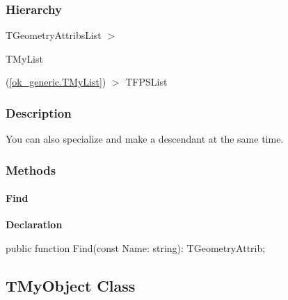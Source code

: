 \documentclass{report}
\newif\ifpdf
\begin{document}
\subsubsection*{\large{\textbf{Hierarchy}}\normalsize\hspace{1ex}\hfill}
TGeometryAttribsList {$>$} \begin{ttfamily}TMyList\end{ttfamily}(\ref{ok_generic.TMyList}) {$>$} 
TFPSList
\subsubsection*{\large{\textbf{Description}}\normalsize\hspace{1ex}\hfill}
You can also specialize and make a descendant at the same time.\subsubsection*{\large{\textbf{Methods}}\normalsize\hspace{1ex}\hfill}
\paragraph*{Find}\hspace*{\fill}

\label{ok_generic.TGeometryAttribsList-Find}
\begin{list}{}{
\setlength{\itemindent}{0cm}
\setlength{\listparindent}{0cm}
\setlength{\leftmargin}{\evensidemargin}
\addtolength{\leftmargin}{\tmplength}
\settowidth{\labelsep}{X}
\addtolength{\leftmargin}{\labelsep}
\setlength{\labelwidth}{\tmplength}
}
\item[\textbf{Declaration}\hfill]
\ifpdf
\begin{flushleft}
\fi
\begin{ttfamily}
public function Find(const Name: string): TGeometryAttrib;\end{ttfamily}

\ifpdf
\end{flushleft}
\fi

\end{list}
\ifpdf
\subsection*{\large{\textbf{TMyObject Class}}\normalsize\hspace{1ex}\hrulefill}
\else
\subsection*{TMyObject Class}
\fi
\label{ok_generic.TMyObject}
\end{document}
